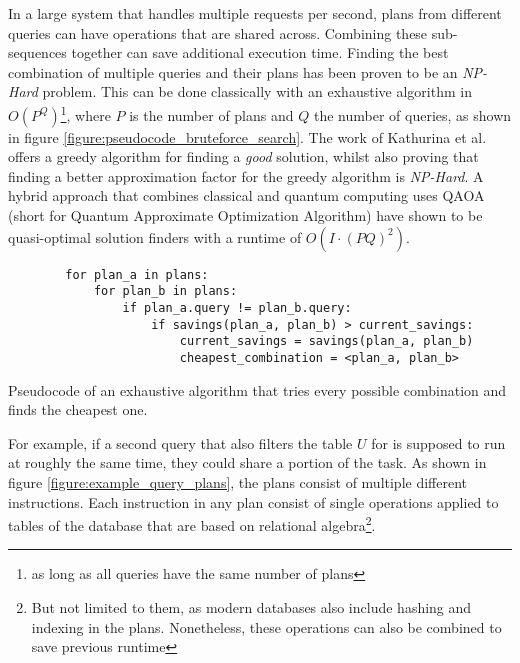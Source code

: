 In a large system that handles multiple requests per second, plans from different queries can have operations that are shared across. Combining these sub-sequences together can save additional execution time\cite{roy_multi-query_2009}. Finding the best combination of multiple queries and their plans has been proven to be an \emph{NP-Hard} problem\cite{sellis_multiple-query_1990}. This can be done classically with an exhaustive algorithm in $O(P^Q)$\footnote{as long as all queries have the same number of plans}, where $P$ is the number of plans and $Q$ the number of queries, as shown in figure \ref{figure:pseudocode_bruteforce_search}. The work of Kathurina et al.\cite{kathuria_provable_mqo} offers a greedy algorithm for finding a \emph{good} solution, whilst also proving that finding a better approximation factor for the greedy algorithm is \emph{NP-Hard}. A hybrid approach that combines classical and quantum computing uses QAOA (short for Quantum Approximate Optimization Algorithm)\cite{farhi_quantum_2014} have shown to be quasi-optimal solution finders with a runtime of $O(I \cdot (PQ)^2)$\cite{fankhauser_multiple_2021}. \par


\begin{listing}[!ht]
    \centering
    \begin{verbatim}
        for plan_a in plans:
            for plan_b in plans:
                if plan_a.query != plan_b.query:
                    if savings(plan_a, plan_b) > current_savings:
                        current_savings = savings(plan_a, plan_b)
                        cheapest_combination = <plan_a, plan_b>
    \end{verbatim}
    \caption{Pseudocode of an exhaustive algorithm that tries every possible combination and finds the cheapest one.}
    \label{figure:pseudocode_bruteforce_search}
\end{listing}

 For example, if a second query that also filters the table $U$ for  is supposed to run at roughly the same time, they could share a portion of the task. As shown in figure \ref{figure:example_query_plans}, the plans consist of multiple different instructions. Each instruction in any plan consist of single operations applied to tables of the database that are based on relational algebra\cite{codd_relational_1970}\footnote{But not limited to them, as modern databases also include hashing and indexing in the plans. Nonetheless, these operations can also be combined to save previous runtime}. 
 
